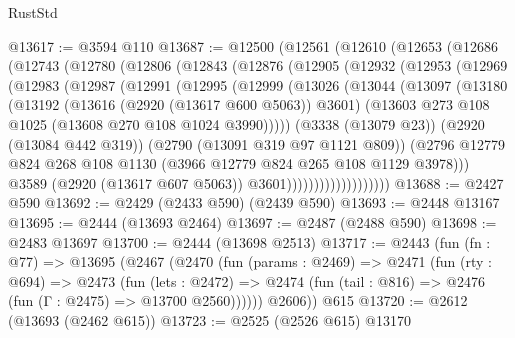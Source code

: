 \begin{lexlean}{RustStd}
\begin{coremodule}
@13617 := @3594 @110
@13687 := @12500
    (@12561
      (@12610
        (@12653
          (@12686
            (@12743
              (@12780
                (@12806
                  (@12843
                    (@12876
                      (@12905
                        (@12932
                          (@12953
                            (@12969
                              (@12983
                                (@12987
                                  (@12991
                                    (@12995
                                      (@12999
                                        (@13026
                                          (@13044
                                            (@13097
                                              (@13180
                                                (@13192
                                                  (@13616 (@2920 (@13617 @600 @5063)) @3601)
                                                  (@13603
                                                    @273
                                                    @108
                                                    @1025
                                                    (@13608 @270 @108 @1024 @3990)))))
                                            (@3338 (@13079 @23))
                                            (@2920 (@13084 @442 @319))
                                            (@2790 (@13091 @319 @97 @1121 @809))
                                            (@2796
                                              @12779
                                              @824
                                              @268
                                              @108
                                              @1130
                                              (@3966 @12779 @824 @265 @108 @1129 @3978)))
                                          @3589
                                          (@2920 (@13617 @607 @5063))
                                          @3601)))))))))))))))))))
@13688 := @2427 @590
@13692 := @2429 (@2433 @590) (@2439 @590)
@13693 := @2448 @13167
@13695 := @2444 (@13693 @2464)
@13697 := @2487 (@2488 @590)
@13698 := @2483 @13697
@13700 := @2444 (@13698 @2513)
@13717 := @2443
    (fun (fn : @77) =>
    @13695
      (@2467
        (@2470
          (fun (params : @2469) =>
          @2471
            (fun (rty : @694) =>
            @2473
              (fun (lets : @2472) =>
              @2474 (fun (tail : @816) => @2476 (fun (Γ : @2475) => @13700 @2560))))))
        @2606))
    @615
@13720 := @2612 (@13693 (@2462 @615))
@13723 := @2525 (@2526 @615) @13170

\end{coremodule}
\end{lexlean}

